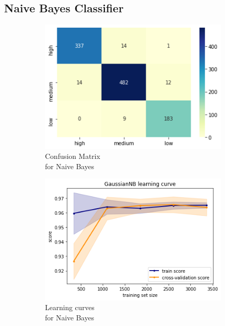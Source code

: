\subsection{Naive Bayes Classifier}
\begin{figure}[h!]
     \captionsetup{justification=centering}             
     \centering
     \begin{subfigure}{0.49\textwidth}
         \centering
         \captionsetup{type=figure}
         \includegraphics[width=\textwidth]{img/classification/nb_confusion.png}
         \caption{Confusion Matrix \\ for Naive Bayes}
         \label{fig:nb_confusion}
     \end{subfigure}
     \begin{subfigure}{0.49\textwidth}
         \centering
         \includegraphics[width=\textwidth]{img/classification/nb_lc.png}
         \caption{Learning curves \\ for Naive Bayes}
         \label{fig:nb_lc}
     \end{subfigure}
     \caption{}
    \label{fig:nb}
\end{figure}

